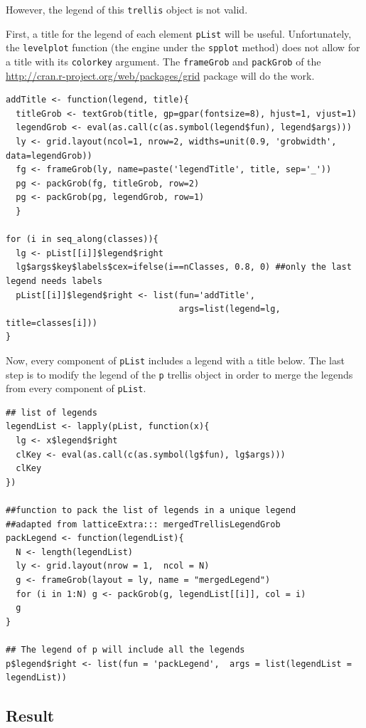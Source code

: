 However, the legend of this \texttt{trellis} object is not valid.  

First, a title for the legend of each element \texttt{pList} will be
useful. Unfortunately, the \texttt{levelplot} function (the engine under the
\texttt{spplot} method) does not allow for a title with its \texttt{colorkey}
argument. The \texttt{frameGrob} and \texttt{packGrob} of the \url{http://cran.r-project.org/web/packages/grid} package will do the work.


\lstset{language=R}
\begin{lstlisting}
addTitle <- function(legend, title){
  titleGrob <- textGrob(title, gp=gpar(fontsize=8), hjust=1, vjust=1)
  legendGrob <- eval(as.call(c(as.symbol(legend$fun), legend$args)))
  ly <- grid.layout(ncol=1, nrow=2, widths=unit(0.9, 'grobwidth', data=legendGrob))
  fg <- frameGrob(ly, name=paste('legendTitle', title, sep='_'))
  pg <- packGrob(fg, titleGrob, row=2)
  pg <- packGrob(pg, legendGrob, row=1)
  }

for (i in seq_along(classes)){
  lg <- pList[[i]]$legend$right
  lg$args$key$labels$cex=ifelse(i==nClasses, 0.8, 0) ##only the last legend needs labels
  pList[[i]]$legend$right <- list(fun='addTitle',
                                  args=list(legend=lg, title=classes[i]))
}
\end{lstlisting}

Now, every component of \texttt{pList} includes a legend with a title
below. The last step is to modify the legend of the \texttt{p} trellis object
in order to merge the legends from every component of \texttt{pList}.


\lstset{language=R}
\begin{lstlisting}
## list of legends
legendList <- lapply(pList, function(x){
  lg <- x$legend$right
  clKey <- eval(as.call(c(as.symbol(lg$fun), lg$args)))
  clKey
})

##function to pack the list of legends in a unique legend
##adapted from latticeExtra::: mergedTrellisLegendGrob
packLegend <- function(legendList){
  N <- length(legendList)
  ly <- grid.layout(nrow = 1,  ncol = N)
  g <- frameGrob(layout = ly, name = "mergedLegend")
  for (i in 1:N) g <- packGrob(g, legendList[[i]], col = i)
  g
}

## The legend of p will include all the legends
p$legend$right <- list(fun = 'packLegend',  args = list(legendList = legendList))
\end{lstlisting}
\subsection{Result}
\label{sec-3-2}


